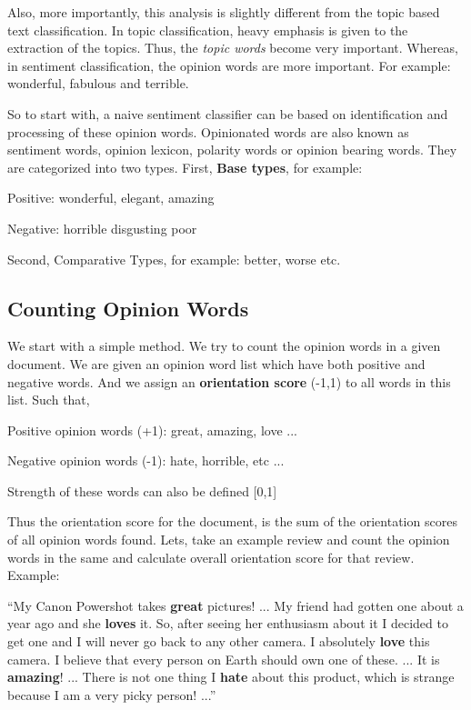 Also, more importantly,  this analysis is slightly different from the topic based text classification. In topic classification, heavy emphasis is given to the extraction of the topics. Thus, the \textit{topic words} become very important.  Whereas, in sentiment classification, the opinion words are more important. For example: wonderful, fabulous and terrible. 

So to start with, a naive sentiment classifier can be based on identification and processing of these opinion words. Opinionated words are also known as sentiment words, opinion lexicon, polarity words or opinion bearing words. They are categorized into two types. First, \textbf{Base types}, for example:

Positive: wonderful, elegant, amazing

Negative: horrible disgusting poor

Second, Comparative Types, for example: better, worse etc.

\subsection{Counting Opinion Words}

We start with a simple method. We try to count the opinion words in a given document. We are given an opinion word list which have both positive and negative words. And we assign an \textbf{orientation score} (-1,1) to all words in this list. Such that, \newline

Positive opinion words (+1): great, amazing, love ...

Negative opinion words (-1): hate, horrible, etc ...

Strength of these words can also be defined [0,1] 
\newline

Thus the orientation score for the document, is the sum of the orientation scores of all opinion words found. Lets, take an example review and count the opinion words in the same and calculate overall orientation score for that review. Example:

“My Canon Powershot takes \textbf{great} pictures! ... My friend had gotten one about a year ago and she \textbf{loves} it. So, after seeing her enthusiasm about it I decided to get one and I will never go back to any other camera. I absolutely \textbf{love} this camera. I believe that every person on Earth should own one of these. ... It is \textbf{amazing}! ... There is not one thing I \textbf{hate} about this product, which is strange because I am a very picky person! ...”

